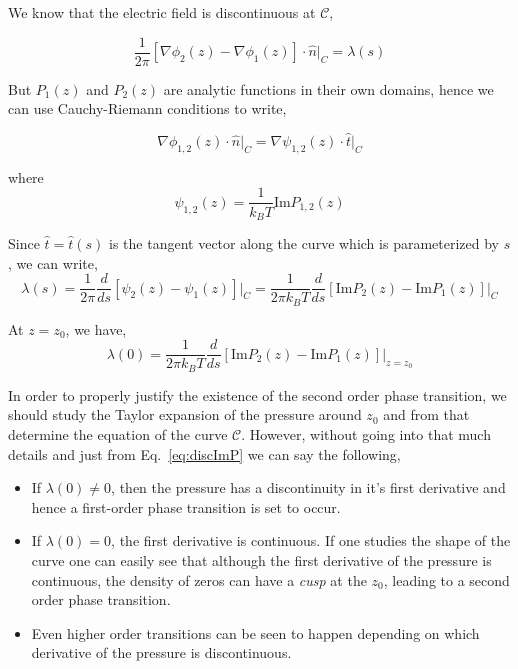 \documentclass[11pt,a4paper]{article}
\begin{document}
We know that the electric field is discontinuous at $\mathcal{C}$,

\begin{equation}
\frac{1}{2\pi} [\nabla \phi_2(z) - \nabla \phi_1(z)] \cdot \hat{n} \bigg|_{C} = \lambda(s)
\end{equation}

But $P_1(z)$ and $P_2(z)$ are analytic functions in their own domains, hence we can use Cauchy-Riemann conditions to write,

\begin{equation}
\nabla \phi_{1,2}(z) \cdot \hat{n} \bigg|_{C} = \nabla \psi_{1,2}(z) \cdot \hat{t} \bigg|_{C}
\end{equation}

where \begin{equation}
\psi_{1,2}(z) = \frac{1}{k_B T} \text{Im} P_{1,2}(z)
\end{equation}

Since $\hat{t} = \hat{t}(s)$ is the tangent vector along the curve which is parameterized by $s$, we can write,
\begin{equation}
    \lambda(s) = \frac{1}{2\pi} \frac{d}{ds} [ \psi_2(z) - \psi_1(z) ] \bigg|_{C} = \frac{1}{2\pi k_B T} \frac{d}{ds} [ \text{Im} P_2(z) - \text{Im} P_1(z) ] \bigg|_{C}
\end{equation}

At $z=z_0$, we have,
\begin{equation}
    \lambda(0) = \frac{1}{2\pi k_B T} \frac{d}{ds} [ \text{Im} P_2(z) - \text{Im} P_1(z) ] \bigg|_{z=z_0}
    \label{eq:discImP}
\end{equation}

In order to properly justify the existence of the second order phase transition, we should study the Taylor expansion of the pressure around $z_0$ and from that determine the equation of the curve $\mathcal{C}$. However, without going into that much details and just from Eq.~\ref{eq:discImP} we can say the following,

\begin{itemize}
    \item If $\lambda(0) \neq 0$, then the pressure has a discontinuity in it's first derivative and hence a first-order phase transition is set to occur.
    \item If $\lambda(0) = 0$, the first derivative is continuous. If one studies the shape of the curve one can easily see that although the first derivative of the pressure is continuous, the density of zeros can have a \emph{cusp} at the $z_0$, leading to a second order phase transition.
    \item Even higher order transitions can be seen to happen depending on which derivative of the pressure is discontinuous.
\end{itemize}
\end{document}
